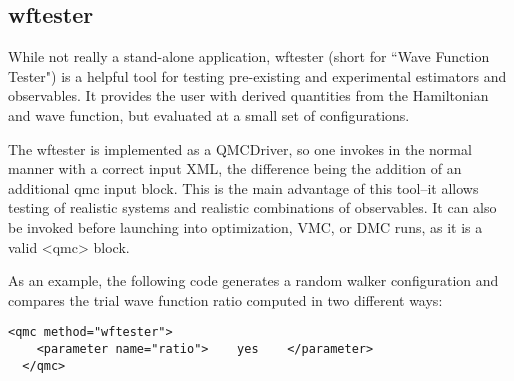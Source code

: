\subsection{wftester}\label{sec:wftester}
While not really a stand-alone application, wftester (short for ``Wave Function Tester") is a helpful tool for testing pre-existing and experimental estimators and observables.  It provides the user with derived quantities from the Hamiltonian and wave function, but evaluated at a small set of configurations. 

The wftester is implemented as a QMCDriver, so one invokes \qmcpack in the normal manner with a correct input XML, the difference being the addition of an additional qmc input block.  This is the main advantage of this tool--it allows testing of realistic systems and realistic combinations of observables.  It can also be invoked before launching into optimization, VMC, or DMC runs, as it is a valid <qmc> block.

 As an example, the following code generates a random walker configuration and compares the trial wave function ratio computed in two different ways:

\begin{lstlisting}[style=QMCPXML,caption=The following executes the wavefunction ratio test in ``wftester" ]
  <qmc method="wftester">
    <parameter name="ratio">    yes    </parameter>
  </qmc>
\end{lstlisting}

